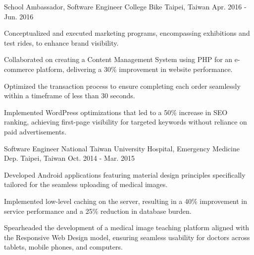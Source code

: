 \begin{cventries}
  \cventry
    {School Ambassador, Software Engineer} %
    {College Bike} %
    {Taipei, Taiwan} %
    {Apr. 2016 - Jun. 2016} %
    {
      \begin{cvitems} %
        \item {Conceptualized and executed marketing programs, encompassing exhibitions and test rides, to enhance brand visibility.}
        \item {Collaborated on creating a Content Management System using PHP for an e-commerce platform, delivering a 30\% improvement in website performance.}
        \item {Optimized the transaction process to ensure completing each order seamlessly within a timeframe of less than 30 seconds.}
        \item {Implemented WordPress optimizations that led to a 50\% increase in SEO ranking, achieving first-page visibility for targeted keywords without reliance on paid advertisements.}
      \end{cvitems}
    }

  \cventry
    {Software Engineer} %
    {National Taiwan University Hospital, Emergency Medicine Dep.} %
    {Taipei, Taiwan} %
    {Oct. 2014 - Mar. 2015} %
    {
      \begin{cvitems} %
        \item {Developed Android applications featuring material design principles specifically tailored for the seamless uploading of medical images.}
        \item {Implemented low-level caching on the server, resulting in a 40\% improvement in service performance and a 25\% reduction in database burden.}
        \item {Spearheaded the development of a medical image teaching platform aligned with the Responsive Web Design model, ensuring seamless usability for doctors across tablets, mobile phones, and computers.}
      \end{cvitems}
    }


\end{cventries}
